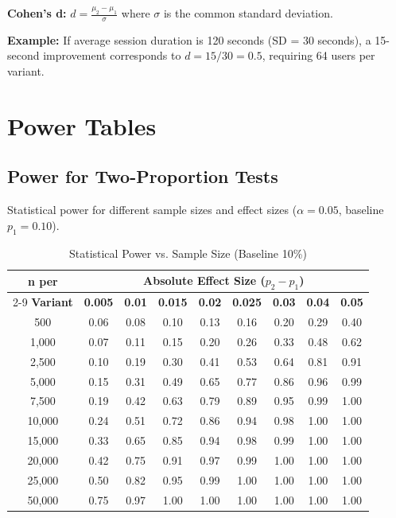 \textbf{Cohen's d:} $d = \frac{\mu_2 - \mu_1}{\sigma}$ where $\sigma$ is the common standard deviation.

\textbf{Example:} If average session duration is 120 seconds (SD = 30 seconds), a 15-second improvement corresponds to $d = 15/30 = 0.5$, requiring 64 users per variant.

\newpage

\section{Power Tables}

\subsection{Power for Two-Proportion Tests}

Statistical power for different sample sizes and effect sizes ($\alpha = 0.05$, baseline $p_1 = 0.10$).

\begin{table}[h]
\centering
\caption{Statistical Power vs. Sample Size (Baseline 10\%)}
\begin{tabular}{c|cccccccc}
\toprule
\textbf{n per} & \multicolumn{8}{c}{\textbf{Absolute Effect Size ($p_2 - p_1$)}} \\
\cmidrule{2-9}
\textbf{Variant} & \textbf{0.005} & \textbf{0.01} & \textbf{0.015} & \textbf{0.02} & \textbf{0.025} & \textbf{0.03} & \textbf{0.04} & \textbf{0.05} \\
\midrule
500 & 0.06 & 0.08 & 0.10 & 0.13 & 0.16 & 0.20 & 0.29 & 0.40 \\
1,000 & 0.07 & 0.11 & 0.15 & 0.20 & 0.26 & 0.33 & 0.48 & 0.62 \\
2,500 & 0.10 & 0.19 & 0.30 & 0.41 & 0.53 & 0.64 & 0.81 & 0.91 \\
5,000 & 0.15 & 0.31 & 0.49 & 0.65 & 0.77 & 0.86 & 0.96 & 0.99 \\
7,500 & 0.19 & 0.42 & 0.63 & 0.79 & 0.89 & 0.95 & 0.99 & 1.00 \\
10,000 & 0.24 & 0.51 & 0.72 & 0.86 & 0.94 & 0.98 & 1.00 & 1.00 \\
15,000 & 0.33 & 0.65 & 0.85 & 0.94 & 0.98 & 0.99 & 1.00 & 1.00 \\
20,000 & 0.42 & 0.75 & 0.91 & 0.97 & 0.99 & 1.00 & 1.00 & 1.00 \\
25,000 & 0.50 & 0.82 & 0.95 & 0.99 & 1.00 & 1.00 & 1.00 & 1.00 \\
50,000 & 0.75 & 0.97 & 1.00 & 1.00 & 1.00 & 1.00 & 1.00 & 1.00 \\
\bottomrule
\end{tabular}
\end{table}

